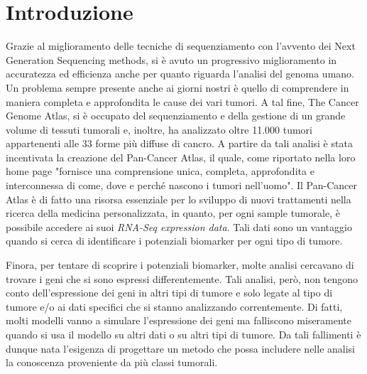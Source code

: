 \section{Introduzione}
\label{sec:intro}
Grazie al miglioramento delle tecniche di sequenziamento con l'avvento dei Next Generation Sequencing methods, 
si è avuto un progressivo miglioramento in accuratezza ed efficienza anche per quanto riguarda l'analisi del genoma
umano. Un problema sempre presente anche ai giorni nostri è quello di comprendere in maniera completa e approfondita
le cause dei vari tumori. A tal fine, The Cancer Genome Atlas, si è occupato del sequenziamento e della gestione di
un grande volume di tessuti tumorali e, inoltre, ha analizzato oltre 11.000 tumori appartenenti alle 33 forme più diffuse
di cancro. A partire da tali analisi è stata incentivata la creazione del Pan-Cancer Atlas, il quale, come riportato
nella loro home page "fornisce una comprensione unica, completa, approfondita e interconnessa di come, dove e 
perché nascono i tumori nell'uomo". Il Pan-Cancer Atlas è di fatto una risorsa essenziale per lo sviluppo di nuovi
trattamenti nella ricerca della medicina personalizzata, in quanto, per ogni sample tumorale, è possibile accedere ai
suoi \textit{RNA-Seq expression data}. Tali dati sono un vantaggio quando si cerca di identificare i potenziali
biomarker per ogni tipo di tumore.

Finora, per tentare di scoprire i potenziali biomarker, molte analisi cercavano di trovare i geni che si sono espressi 
differentemente. Tali analisi, però, non tengono conto dell'espressione dei geni in altri tipi di tumore e solo legate
al tipo di tumore e/o ai dati specifici che si stanno analizzando correntemente. Di fatti, molti modelli vanno a 
simulare l'espressione dei geni ma falliscono miseramente quando si usa il modello su altri dati o su altri
tipi di tumore. Da tali fallimenti è dunque nata l'esigenza di progettare un metodo che possa includere nelle analisi
la conoscenza proveniente da più classi tumorali.


